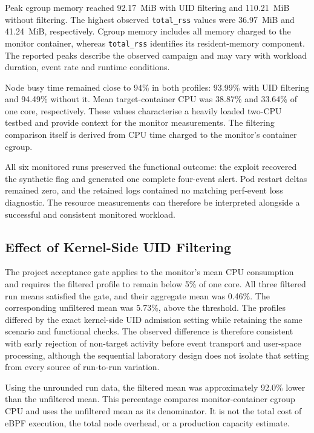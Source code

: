 Peak cgroup memory reached 92.17~MiB with UID filtering and 110.21~MiB without
filtering. The highest observed \texttt{total\_rss} values were 36.97~MiB and
41.24~MiB, respectively. Cgroup memory includes all memory charged to the
monitor container, whereas \texttt{total\_rss} identifies its resident-memory
component. The reported peaks describe the observed campaign and may vary with
workload duration, event rate and runtime conditions.

Node busy time remained close to 94\% in both profiles: 93.99\% with UID
filtering and 94.49\% without it. Mean target-container CPU was 38.87\% and
33.64\% of one core, respectively. These values characterise a heavily loaded
two-CPU testbed and provide context for the monitor measurements. The filtering
comparison itself is derived from CPU time charged to the monitor's container
cgroup.

All six monitored runs preserved the functional outcome: the exploit recovered
the synthetic flag and generated one complete four-event alert. Pod restart
deltas remained zero, and the retained logs contained no matching perf-event
loss diagnostic. The resource measurements can therefore be interpreted
alongside a successful and consistent monitored workload.

\subsection{Effect of Kernel-Side UID Filtering}
\label{subsec:evaluation-uid-filter-effect}

The project acceptance gate applies to the monitor's mean CPU consumption and
requires the filtered profile to remain below 5\% of one core. All three
filtered run means satisfied the gate, and their aggregate mean was 0.46\%.
The corresponding unfiltered mean was 5.73\%, above the threshold. The profiles
differed by the exact kernel-side UID admission setting while retaining the
same scenario and functional checks. The observed difference is therefore
consistent with early rejection of non-target activity before event transport
and user-space processing, although the sequential laboratory design does not
isolate that setting from every source of run-to-run variation.

Using the unrounded run data, the filtered mean was approximately 92.0\% lower
than the unfiltered mean. This percentage compares monitor-container cgroup CPU
and uses the unfiltered mean as its denominator. It is not the total cost of
eBPF execution, the total node overhead, or a production capacity estimate.

